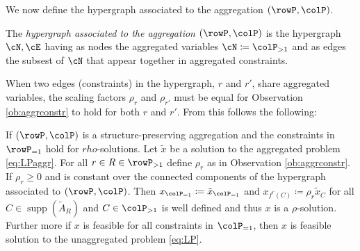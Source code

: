 \documentclass[smallextended,natbib]{svjour3}       %
\DeclareMathOperator{\supp}{supp}
\numberwithin{definition}{section}
\numberwithin{theorem}{section}
\numberwithin{proposition}{section}
\begin{document}
We now define the hypergraph associated to the aggregation \((\rowP, \colP)\).
\begin{definition}
  The \emph{hypergraph associated to the aggregation \((\rowP, \colP)\)} is the hypergraph \(\cN, \cE\) having as nodes the aggregated variables \(\cN \coloneqq \colP_{>1}\) and as edges the subsest of \(\cN\) that appear together in aggregated constraints.
\end{definition}

When two edges (constraints) in the hypergraph, \(r\) and \(r'\), share aggregated variables, 
the scaling factors \(\rho_r\) and \(\rho_{r'}\) must be equal for Observation \ref{ob:aggrconstr} to hold for both \(r\) and \(r'\). 
From this follows the following:
\begin{proposition}
\label{prop:xaggfeasible}
If \((\rowP, \colP)\) is a structure-preserving aggregation and the constraints in \(\rowP_{=1}\) hold for \(rho\)-solutions. Let \(\tilde{x}\) be a solution 
to the aggregated problem \eqref{eq:LPaggr}. For all \(r \in R \in \rowP_{>1}\) define \(\rho_r\) as in Observation \ref{ob:aggrconstr}. If \(\rho_r \geq 0\) and is constant over the connected components of the hypergraph associated to \((\rowP, \colP)\). 
Then \(x_{\colP_{=1}} \coloneqq \tilde{x}_{\colP_{=1}}\) and \(x_{f^r(C)} \coloneqq \rho_r \tilde{x}_C\) for all \(C \in \supp(\tilde{A}_R)\) and \(C \in \colP_{>1}\) is well defined and thus \(x\) is a \(\rho\)-solution.
Further more if \(x\) is feasible for all constraints in \(\colP_{=1}\), then \(x\) is feasible solution to the unaggregated problem \eqref{eq:LP}.
\end{proposition}
\end{document}
